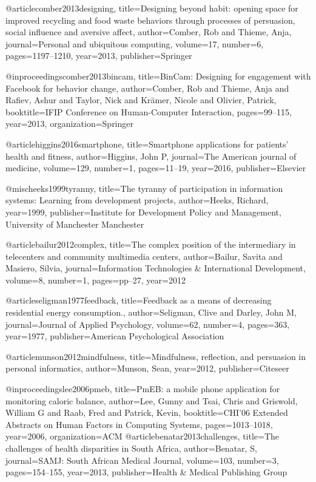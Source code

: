 @article{comber2013designing,
  title={Designing beyond habit: opening space for improved recycling and food waste behaviors through processes of persuasion, social influence and aversive affect},
  author={Comber, Rob and Thieme, Anja},
  journal={Personal and ubiquitous computing},
  volume={17},
  number={6},
  pages={1197--1210},
  year={2013},
  publisher={Springer}
}

@inproceedings{comber2013bincam,
  title={BinCam: Designing for engagement with Facebook for behavior change},
  author={Comber, Rob and Thieme, Anja and Rafiev, Ashur and Taylor, Nick and Kr{\"a}mer, Nicole and Olivier, Patrick},
  booktitle={IFIP Conference on Human-Computer Interaction},
  pages={99--115},
  year={2013},
  organization={Springer}
}


@article{higgins2016smartphone,
  title={Smartphone applications for patients' health and fitness},
  author={Higgins, John P},
  journal={The American journal of medicine},
  volume={129},
  number={1},
  pages={11--19},
  year={2016},
  publisher={Elsevier}
}

@misc{heeks1999tyranny,
  title={The tyranny of participation in information systems: Learning from development projects},
  author={Heeks, Richard},
  year={1999},
  publisher={Institute for Development Policy and Management, University of Manchester Manchester}
}

@article{bailur2012complex,
  title={The complex position of the intermediary in telecenters and community multimedia centers},
  author={Bailur, Savita and Masiero, Silvia},
  journal={Information Technologies \& International Development},
  volume={8},
  number={1},
  pages={pp--27},
  year={2012}
}


@article{seligman1977feedback,
  title={Feedback as a means of decreasing residential energy consumption.},
  author={Seligman, Clive and Darley, John M},
  journal={Journal of Applied Psychology},
  volume={62},
  number={4},
  pages={363},
  year={1977},
  publisher={American Psychological Association}
}

@article{munson2012mindfulness,
  title={Mindfulness, reflection, and persuasion in personal informatics},
  author={Munson, Sean},
  year={2012},
  publisher={Citeseer}
}

@inproceedings{lee2006pmeb,
  title={PmEB: a mobile phone application for monitoring caloric balance},
  author={Lee, Gunny and Tsai, Chris and Griswold, William G and Raab, Fred and Patrick, Kevin},
  booktitle={CHI'06 Extended Abstracts on Human Factors in Computing Systems},
  pages={1013--1018},
  year={2006},
  organization={ACM}
}
@article{benatar2013challenges,
  title={The challenges of health disparities in South Africa},
  author={Benatar, S},
  journal={SAMJ: South African Medical Journal},
  volume={103},
  number={3},
  pages={154--155},
  year={2013},
  publisher={Health \& Medical Publishing Group}
}

